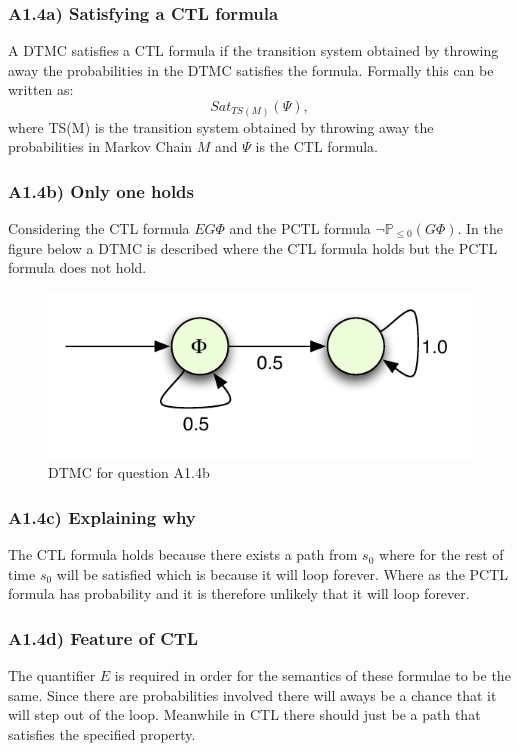 \documentclass[12pt]{report}
\begin{document}
\subsubsection*{A1.4a) Satisfying a CTL formula}
A DTMC satisfies a CTL formula if the transition system obtained by throwing away the probabilities in the DTMC satisfies the formula. Formally this can be written as:
$$Sat_{TS(M)}(\Psi),$$
where TS(M) is the transition system obtained by throwing away the probabilities in Markov Chain $M$ and $\Psi$ is the CTL formula.

\subsubsection*{A1.4b) Only one holds}
Considering the CTL formula $EG \Phi$ and the PCTL formula $\neg \mathbb{P}_{\leq 0}(G \Phi)$. In the figure below a DTMC is described where the CTL formula holds but the PCTL formula does not hold.
\begin{figure}[H]
	\begin{center}
		\includegraphics[scale=.85]{../GFX/Answer-A1-4b.pdf}
	\end{center}
	\caption{DTMC for question A1.4b}
	\label{fig:1a14b}
\end{figure}

\subsubsection*{A1.4c) Explaining why}
The CTL formula holds because there exists a path from $s_0$ where for the rest of time $s_0$ will be satisfied which is because it will loop forever. Where as the PCTL formula has probability and it is therefore unlikely that it will loop forever.

\subsubsection*{A1.4d) Feature of CTL}
The quantifier $E$ is required in order for the semantics of these formulae to be the same. Since there are probabilities involved there will aways be a chance that it will step out of the loop. Meanwhile in CTL there should just be a path that satisfies the specified property.
\end{document}
